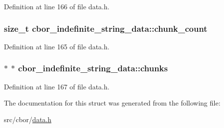Definition at line 166 of file data.\-h.

\hypertarget{structcbor__indefinite__string__data_a86c3abce37287c14985b5f2a0d1935d7}{
\subsubsection[{chunk\-\_\-count}]{\setlength{\rightskip}{0pt plus 5cm}size\-\_\-t cbor\-\_\-indefinite\-\_\-string\-\_\-data\-::chunk\-\_\-count}}\label{structcbor__indefinite__string__data_a86c3abce37287c14985b5f2a0d1935d7}


Definition at line 165 of file data.\-h.

\hypertarget{structcbor__indefinite__string__data_ac34c0d9bd1447f53149878128e19a414}{
\subsubsection[{chunks}]{$\ast$ $\ast$ cbor\-\_\-indefinite\-\_\-string\-\_\-data\-::chunks}}\label{structcbor__indefinite__string__data_ac34c0d9bd1447f53149878128e19a414}


Definition at line 167 of file data.\-h.



The documentation for this struct was generated from the following file\-:\begin{DoxyCompactItemize}
\item 
src/cbor/\hyperlink{data_8h}{data.\-h}\end{DoxyCompactItemize}
